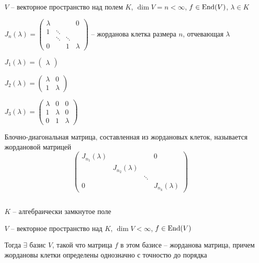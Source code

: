    \par $V$ -- векторное пространство над полем $K$, $\dim V = n < \infty$, $f \in \operatorname{End}(V)$, $\lambda \in K$
    \par $J_n(\lambda) = \begin{pmatrix}
        \lambda & & & 0 \\
        1 & \ddots & & \\
        & \ddots & \ddots & \\
        0 & & 1 & \lambda
    \end{pmatrix}$ -- жорданова клетка размера $n$, отчевающая $\lambda$
    \par $J_1(\lambda) = \begin{pmatrix}
        \lambda
    \end{pmatrix}$
    \par $J_2(\lambda) = \begin{pmatrix}
        \lambda & 0 \\
        1 & \lambda
    \end{pmatrix}$
    \par $J_3(\lambda) = \begin{pmatrix}
        \lambda & 0 & 0 \\
        1 & \lambda & 0 \\
        0 & 1 & \lambda
    \end{pmatrix}$

    \begin{definition}
        Блочно-диагональная матрица, составленная из жордановых клеток, называется жордановой матрицей
        \[
            \begin{pmatrix}
                \boxed{J_{n_1}(\lambda)} & & & 0 \\
                & \boxed{J_{n_2}(\lambda)} & & \\
                & & \ddots & \\
                0 & & & \boxed{J_{n_k}(\lambda)}
            \end{pmatrix}    
        \]
    \end{definition}

    \begin{theorem*}
        $ $
        \par $K$ -- алгебраически замкнутое поле
        \par $V$ -- векторное пространство над $K$, $\dim V < \infty$, $f \in \operatorname{End}(V)$
        \par Тогда $\exists$ базис $V$, такой что матрица $f$ в этом базисе -- жорданова матрица, причем жордановы 
        клетки определены однозначно с точностю до порядка
    \end{theorem*}

